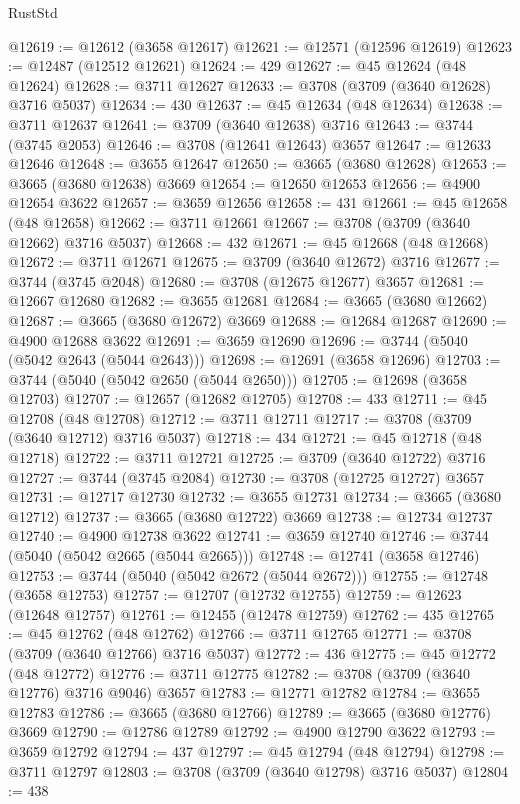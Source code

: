 \begin{lexlean}{RustStd}
\begin{coremodule}
@12619 := @12612 (@3658 @12617)
@12621 := @12571 (@12596 @12619)
@12623 := @12487 (@12512 @12621)
@12624 := 429
@12627 := @45 @12624 (@48 @12624)
@12628 := @3711 @12627
@12633 := @3708 (@3709 (@3640 @12628) @3716 @5037)
@12634 := 430
@12637 := @45 @12634 (@48 @12634)
@12638 := @3711 @12637
@12641 := @3709 (@3640 @12638) @3716
@12643 := @3744 (@3745 @2053)
@12646 := @3708 (@12641 @12643) @3657
@12647 := @12633 @12646
@12648 := @3655 @12647
@12650 := @3665 (@3680 @12628)
@12653 := @3665 (@3680 @12638) @3669
@12654 := @12650 @12653
@12656 := @4900 @12654 @3622
@12657 := @3659 @12656
@12658 := 431
@12661 := @45 @12658 (@48 @12658)
@12662 := @3711 @12661
@12667 := @3708 (@3709 (@3640 @12662) @3716 @5037)
@12668 := 432
@12671 := @45 @12668 (@48 @12668)
@12672 := @3711 @12671
@12675 := @3709 (@3640 @12672) @3716
@12677 := @3744 (@3745 @2048)
@12680 := @3708 (@12675 @12677) @3657
@12681 := @12667 @12680
@12682 := @3655 @12681
@12684 := @3665 (@3680 @12662)
@12687 := @3665 (@3680 @12672) @3669
@12688 := @12684 @12687
@12690 := @4900 @12688 @3622
@12691 := @3659 @12690
@12696 := @3744 (@5040 (@5042 @2643 (@5044 @2643)))
@12698 := @12691 (@3658 @12696)
@12703 := @3744 (@5040 (@5042 @2650 (@5044 @2650)))
@12705 := @12698 (@3658 @12703)
@12707 := @12657 (@12682 @12705)
@12708 := 433
@12711 := @45 @12708 (@48 @12708)
@12712 := @3711 @12711
@12717 := @3708 (@3709 (@3640 @12712) @3716 @5037)
@12718 := 434
@12721 := @45 @12718 (@48 @12718)
@12722 := @3711 @12721
@12725 := @3709 (@3640 @12722) @3716
@12727 := @3744 (@3745 @2084)
@12730 := @3708 (@12725 @12727) @3657
@12731 := @12717 @12730
@12732 := @3655 @12731
@12734 := @3665 (@3680 @12712)
@12737 := @3665 (@3680 @12722) @3669
@12738 := @12734 @12737
@12740 := @4900 @12738 @3622
@12741 := @3659 @12740
@12746 := @3744 (@5040 (@5042 @2665 (@5044 @2665)))
@12748 := @12741 (@3658 @12746)
@12753 := @3744 (@5040 (@5042 @2672 (@5044 @2672)))
@12755 := @12748 (@3658 @12753)
@12757 := @12707 (@12732 @12755)
@12759 := @12623 (@12648 @12757)
@12761 := @12455 (@12478 @12759)
@12762 := 435
@12765 := @45 @12762 (@48 @12762)
@12766 := @3711 @12765
@12771 := @3708 (@3709 (@3640 @12766) @3716 @5037)
@12772 := 436
@12775 := @45 @12772 (@48 @12772)
@12776 := @3711 @12775
@12782 := @3708 (@3709 (@3640 @12776) @3716 @9046) @3657
@12783 := @12771 @12782
@12784 := @3655 @12783
@12786 := @3665 (@3680 @12766)
@12789 := @3665 (@3680 @12776) @3669
@12790 := @12786 @12789
@12792 := @4900 @12790 @3622
@12793 := @3659 @12792
@12794 := 437
@12797 := @45 @12794 (@48 @12794)
@12798 := @3711 @12797
@12803 := @3708 (@3709 (@3640 @12798) @3716 @5037)
@12804 := 438

\end{coremodule}
\end{lexlean}

